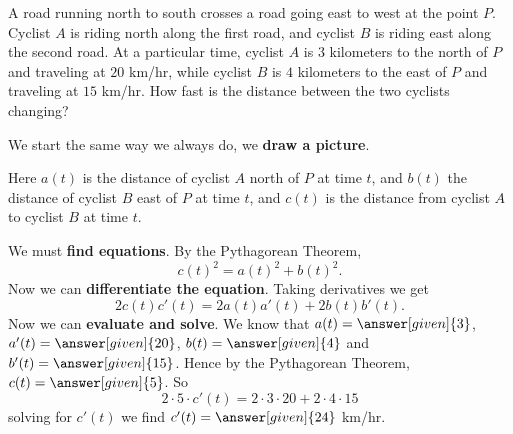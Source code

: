 \documentclass{ximera}
\begin{document}
\begin{example}
A road running north to south crosses a road going east to west at the
point $P$.  Cyclist $A$ is riding north along the first road, and
cyclist $B$ is riding east along the second road.  At a particular
time, cyclist $A$ is $3$ kilometers to the north of $P$ and traveling
at $20$ km/hr, while cyclist $B$ is $4$ kilometers to the east of $P$
and traveling at $15$ km/hr.  How fast is the distance between the two
cyclists changing?


\begin{explanation}
We start the same way we always do, we \textbf{draw a picture}.
\begin{image}
\end{image}
Here $a(t)$ is the distance of cyclist $A$ north of $P$ at time $t$,
and $b(t)$ the distance of cyclist $B$ east of $P$ at time $t$, and
$c(t)$ is the distance from cyclist $A$ to cyclist $B$ at time $t$.

We must \textbf{find equations}.  By the Pythagorean Theorem,
\[
c(t)^2=a(t)^2+b(t)^2.
\] 
Now we can \textbf{differentiate the equation}. Taking derivatives we
get
\[
2c(t)c'(t)=2a(t)a'(t)+2b(t)b'(t).
\]
Now we can \textbf{evaluate and solve}.  We know that $a(t) =
\answer[given]{3}$, $a'(t) = \answer[given]{20}$, $b(t) =
\answer[given]{4}$ and $b'(t) = \answer[given]{15}$. Hence by the
Pythagorean Theorem, $c(t) = \answer[given]{5}$. So
\[
2\cdot 5 \cdot c'(t) = 2 \cdot 3\cdot 20 + 2 \cdot 4 \cdot 15
\]
solving for $c'(t)$ we find $c'(t) = \answer[given]{24}$ km/hr.
\end{explanation}
\end{example}
\end{document}
